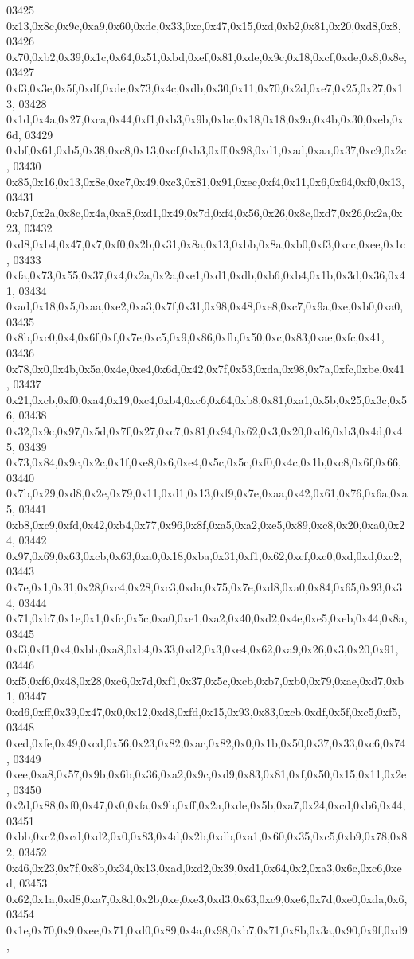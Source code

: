 \begin{DoxyCode}
03425   0x13,0x8c,0x9c,0xa9,0x60,0xdc,0x33,0xc,0x47,0x15,0xd,0xb2,0x81,0x20,0xd8,0x8,
03426   0x70,0xb2,0x39,0x1c,0x64,0x51,0xbd,0xef,0x81,0xde,0x9c,0x18,0xcf,0xde,0x8,0x8e,
03427   0xf3,0x3e,0x5f,0xdf,0xde,0x73,0x4c,0xdb,0x30,0x11,0x70,0x2d,0xe7,0x25,0x27,0x13,
03428   0x1d,0x4a,0x27,0xca,0x44,0xf1,0xb3,0x9b,0xbc,0x18,0x18,0x9a,0x4b,0x30,0xeb,0x6d,
03429   0xbf,0x61,0xb5,0x38,0xc8,0x13,0xcf,0xb3,0xff,0x98,0xd1,0xad,0xaa,0x37,0xc9,0x2c,
03430   0x85,0x16,0x13,0x8e,0xc7,0x49,0xc3,0x81,0x91,0xec,0xf4,0x11,0x6,0x64,0xf0,0x13,
03431   0xb7,0x2a,0x8c,0x4a,0xa8,0xd1,0x49,0x7d,0xf4,0x56,0x26,0x8c,0xd7,0x26,0x2a,0x23,
03432   0xd8,0xb4,0x47,0x7,0xf0,0x2b,0x31,0x8a,0x13,0xbb,0x8a,0xb0,0xf3,0xcc,0xee,0x1c,
03433   0xfa,0x73,0x55,0x37,0x4,0x2a,0x2a,0xe1,0xd1,0xdb,0xb6,0xb4,0x1b,0x3d,0x36,0x41,
03434   0xad,0x18,0x5,0xaa,0xe2,0xa3,0x7f,0x31,0x98,0x48,0xe8,0xc7,0x9a,0xe,0xb0,0xa0,
03435   0x8b,0xc0,0x4,0x6f,0xf,0x7e,0xc5,0x9,0x86,0xfb,0x50,0xc,0x83,0xae,0xfc,0x41,
03436   0x78,0x0,0x4b,0x5a,0x4e,0xe4,0x6d,0x42,0x7f,0x53,0xda,0x98,0x7a,0xfc,0xbe,0x41,
03437   0x21,0xcb,0xf0,0xa4,0x19,0xc4,0xb4,0xc6,0x64,0xb8,0x81,0xa1,0x5b,0x25,0x3c,0x56,
03438   0x32,0x9c,0x97,0x5d,0x7f,0x27,0xc7,0x81,0x94,0x62,0x3,0x20,0xd6,0xb3,0x4d,0x45,
03439   0x73,0x84,0x9c,0x2c,0x1f,0xe8,0x6,0xe4,0x5c,0x5c,0xf0,0x4c,0x1b,0xc8,0x6f,0x66,
03440   0x7b,0x29,0xd8,0x2e,0x79,0x11,0xd1,0x13,0xf9,0x7e,0xaa,0x42,0x61,0x76,0x6a,0xa5,
03441   0xb8,0xc9,0xfd,0x42,0xb4,0x77,0x96,0x8f,0xa5,0xa2,0xe5,0x89,0xc8,0x20,0xa0,0x24,
03442   0x97,0x69,0x63,0xcb,0x63,0xa0,0x18,0xba,0x31,0xf1,0x62,0xcf,0xc0,0xd,0xd,0xc2,
03443   0x7e,0x1,0x31,0x28,0xc4,0x28,0xc3,0xda,0x75,0x7e,0xd8,0xa0,0x84,0x65,0x93,0x34,
03444   0x71,0xb7,0x1e,0x1,0xfc,0x5c,0xa0,0xe1,0xa2,0x40,0xd2,0x4e,0xe5,0xeb,0x44,0x8a,
03445   0xf3,0xf1,0x4,0xbb,0xa8,0xb4,0x33,0xd2,0x3,0xe4,0x62,0xa9,0x26,0x3,0x20,0x91,
03446   0xf5,0xf6,0x48,0x28,0xc6,0x7d,0xf1,0x37,0x5c,0xcb,0xb7,0xb0,0x79,0xae,0xd7,0xb1,
03447   0xd6,0xff,0x39,0x47,0x0,0x12,0xd8,0xfd,0x15,0x93,0x83,0xcb,0xdf,0x5f,0xc5,0xf5,
03448   0xed,0xfe,0x49,0xcd,0x56,0x23,0x82,0xac,0x82,0x0,0x1b,0x50,0x37,0x33,0xc6,0x74,
03449   0xee,0xa8,0x57,0x9b,0x6b,0x36,0xa2,0x9c,0xd9,0x83,0x81,0xf,0x50,0x15,0x11,0x2e,
03450   0x2d,0x88,0xf0,0x47,0x0,0xfa,0x9b,0xff,0x2a,0xde,0x5b,0xa7,0x24,0xcd,0xb6,0x44,
03451   0xbb,0xc2,0xcd,0xd2,0x0,0x83,0x4d,0x2b,0xdb,0xa1,0x60,0x35,0xc5,0xb9,0x78,0x82,
03452   0x46,0x23,0x7f,0x8b,0x34,0x13,0xad,0xd2,0x39,0xd1,0x64,0x2,0xa3,0x6c,0xc6,0xed,
03453   0x62,0x1a,0xd8,0xa7,0x8d,0x2b,0xe,0xe3,0xd3,0x63,0xc9,0xe6,0x7d,0xe0,0xda,0x6,
03454   0x1e,0x70,0x9,0xee,0x71,0xd0,0x89,0x4a,0x98,0xb7,0x71,0x8b,0x3a,0x90,0x9f,0xd9,

\end{DoxyCode}
